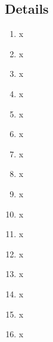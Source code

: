 \documentclass[../report.tex]{subfiles}
\begin{document}
\subsection{Details} \label{sec:comparison_details}

\begin{enumerate}
 \item x
 \item x
 \item x
 \item x
 \item x
 \item x
 \item x
 \item x
 \item x
 \item x
 \item x
 \item x
 \item x
 \item x
 \item x
 \item x
\end{enumerate}
\end{document}
